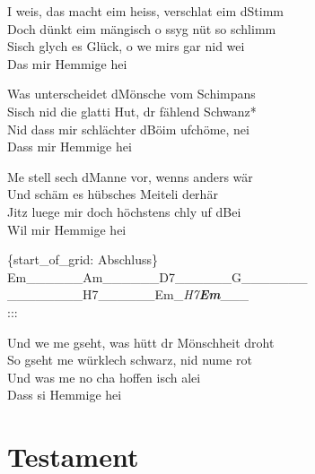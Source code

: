 \documentclass[
  letterpaper,
]{scrbook}
\begin{document}
I weis, das macht eim heiss, verschlat eim d\textquotesingle Stimm\\
Doch dünkt eim mängisch o s\textquotesingle syg nüt so schlimm\\
S\textquotesingle isch glych es Glück, o we mirs gar nid wei\\
Das mir Hemmige hei

Was unterscheidet d\textquotesingle Mönsche vom Schimpans\\
S\textquotesingle isch nid die glatti Hut, dr fählend Schwanz*\\
Nid dass mir schlächter d\textquotesingle Böim ufchöme, nei\\
Dass mir Hemmige hei

Me stell sech d\textquotesingle Manne vor, wenns anders wär\\
Und s\textquotesingle chäm es hübsches Meiteli derhär\\
Jitz luege mir doch höchstens chly uf d\textquotesingle Bei\\
Wil mir Hemmige hei

\{start\_of\_grid: Abschluss\}\\
\textbar Em\_\_\_\_\_\_\textbar Am\_\_\_\_\_\_\textbar D7\_\_\_\_\_\_\textbar G\_\_\_\_\_\_\_\textbar{}\\
\textbar\_\_\_\_\_\_\_\_\textbar H7\_\_\_\_\_\_\textbar Em\_\emph{H7\textbf{\textbar Em}}\_\_\_\textbar{}\\
:::

Und we me gseht, was hütt dr Mönschheit droht\\
So gseht me würklech schwarz, nid nume rot\\
Und was me no cha hoffen isch alei\\
Dass si Hemmige hei

\hypertarget{testament}{%
\chapter{Testament}\label{testament}}
\end{document}

